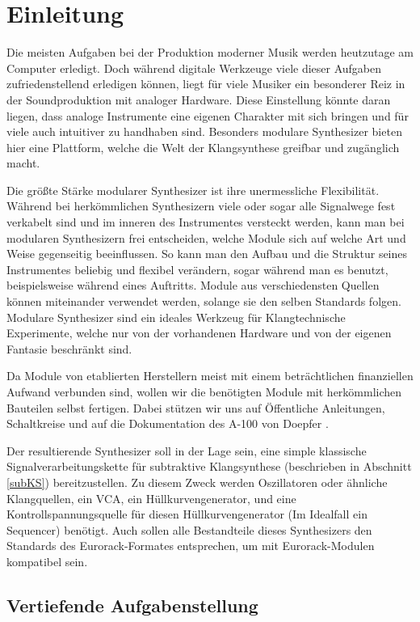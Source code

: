 \chapter{Einleitung}

Die meisten Aufgaben bei der Produktion moderner Musik werden heutzutage am Computer erledigt. Doch während digitale Werkzeuge viele dieser Aufgaben zufriedenstellend erledigen können, liegt für viele Musiker ein besonderer Reiz in der Soundproduktion mit analoger Hardware. Diese Einstellung könnte daran liegen, dass analoge Instrumente eine eigenen Charakter mit sich bringen und für viele auch intuitiver zu handhaben sind. Besonders modulare Synthesizer bieten hier eine Plattform, welche die Welt der Klangsynthese greifbar und zugänglich macht.

Die größte Stärke modularer Synthesizer ist ihre unermessliche Flexibilität. Während bei herkömmlichen Synthesizern viele oder sogar alle Signalwege fest verkabelt sind und im inneren des Instrumentes versteckt werden, kann man bei modularen Synthesizern frei entscheiden, welche Module sich auf welche Art und Weise gegenseitig beeinflussen. So kann man den Aufbau und die Struktur seines Instrumentes beliebig und flexibel verändern, sogar während man es benutzt, beispielsweise während eines Auftritts. Module aus verschiedensten Quellen können miteinander verwendet werden, solange sie den selben Standards folgen. Modulare Synthesizer sind ein ideales Werkzeug für Klangtechnische Experimente, welche nur von der vorhandenen Hardware und von der eigenen Fantasie beschränkt sind.

Da Module von etablierten Herstellern meist mit einem beträchtlichen finanziellen Aufwand verbunden sind, wollen wir die benötigten Module mit herkömmlichen Bauteilen selbst fertigen. Dabei stützen wir uns auf Öffentliche Anleitungen, Schaltkreise und auf die Dokumentation des A-100 von Doepfer \cite{doepfer:A-100}.

Der resultierende Synthesizer soll in der Lage sein, eine simple klassische Signalverarbeitungskette für subtraktive Klangsynthese (beschrieben in Abschnitt \ref{subKS}) bereitzustellen. Zu diesem Zweck werden Oszillatoren oder ähnliche Klangquellen, ein \ac{VCA}, ein Hüllkurvengenerator, und eine Kontrollspannungsquelle für diesen Hüllkurvengenerator (Im Idealfall ein Sequencer) benötigt. Auch sollen alle Bestandteile dieses Synthesizers den Standards des Eurorack-Formates entsprechen, um mit Eurorack-Modulen kompatibel sein.

\section{Vertiefende Aufgabenstellung}

